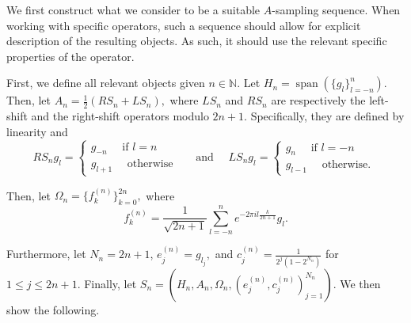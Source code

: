 \documentclass{amsart}
\theoremstyle{definition}
\theoremstyle{remark}
\def \Span{\operatorname{span}}
\begin{document}

We first construct what we consider to be a suitable $A$-sampling sequence. When working with specific operators, such a sequence should allow for explicit description of the resulting objects. As such, it should use the relevant specific properties of the operator.

First, we define all relevant objects given $n\in\mathbb{N}$. Let $H_n=\Span(\{g_l\}_{l=-n}^n)$. Then, let $A_n=\frac{1}{2}(RS_n+LS_n),$ where $LS_n$ and $RS_n$ are respectively the left-shift and the right-shift operators modulo $2n+1$. Specifically, they are defined by linearity and $$RS_n g_l=\begin{cases}
	g_{-n} \quad \text{ if $l=n$ }\\
	g_{l+1} \quad \text{ otherwise }
\end{cases} \quad \text{ and }\quad LS_ng_l=\begin{cases}
g_n \quad \text{ if $l=-n$ }\\
g_{l-1}\quad \text{ otherwise. }
\end{cases}$$

Then, let $\Omega_n=\{f_k^{(n)}\}_{k=0}^{2n},$ where $$f_k^{(n)}=\frac{1}{\sqrt{2n+1}}\sum_{l=-n}^n e^{-2\pi i l \frac{k}{2n+1}}g_l.$$

Furthermore, let $N_n=2n+1$, $e_j^{(n)}=g_{l_j},$ and $c_j^{(n)}=\frac{1}{2^j(1-2^{N_n})}$ for $1\leq j\leq 2n+1.$ Finally, let $S_n=(H_n,A_n,\Omega_n, (e_j^{(n)},c_j^{(n)})_{j=1}^{N_n}).$ We then show the following.
\end{document}

